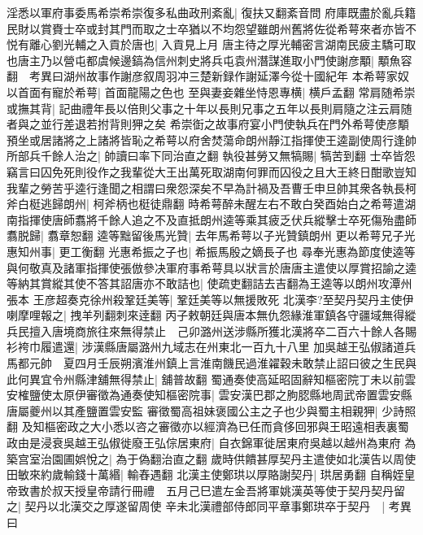 淫悉以軍府事委馬希崇希崇復多私曲政刑紊亂|{
	復扶又翻紊音問}
府庫既盡於亂兵籍民財以賞賚士卒或封其門而取之士卒猶以不均怨望雖朗州舊將佐從希萼來者亦皆不悦有離心劉光輔之入貢於唐也|{
	入貢見上月}
唐主待之厚光輔密言湖南民疲主驕可取也唐主乃以營屯都虞候邊鎬為信州刺史將兵屯袁州潛謀進取小門使謝彦顒|{
	顒魚容翻　考異曰湖州故事作謝彦叙周羽冲三楚新録作謝延澤今從十國紀年}
本希萼家奴以首面有寵於希萼|{
	首面龍陽之色也}
至與妻妾雜坐恃恩專横|{
	横戶孟翻}
常肩随希崇或撫其背|{
	記曲禮年長以倍則父事之十年以長則兄事之五年以長則肩隨之注云肩随者與之並行差退若拊背則狎之矣}
希崇衘之故事府宴小門使執兵在門外希萼使彦顒預坐或居諸將之上諸將皆恥之希萼以府舍焚蕩命朗州靜江指揮使王逵副使周行逢帥所部兵千餘人治之|{
	帥讀曰率下同治直之翻}
執役甚勞又無犒賜|{
	犒苦到翻}
士卒皆怨竊言曰囚免死則役作之我輩從大王出萬死取湖南何罪而囚役之且大王終日酣歌豈知我輩之勞苦乎逵行逢聞之相謂曰衆怨深矣不早為計禍及吾曹壬申旦帥其衆各執長柯斧白梃逃歸朗州|{
	柯斧柄也梃徒鼎翻}
時希萼醉未醒左右不敢白癸酉始白之希萼遣湖南指揮使唐師翥將千餘人追之不及直抵朗州逵等乘其疲乏伏兵縱擊士卒死傷殆盡師翥脱歸|{
	翥章恕翻}
逵等黜留後馬光贊|{
	去年馬希萼以子光贊鎮朗州}
更以希萼兄子光惠知州事|{
	更工衡翻}
光惠希振之子也|{
	希振馬殷之嫡長子也}
尋奉光惠為節度使逵等與何敬真及諸軍指揮使張倣參决軍府事希萼具以狀言於唐唐主遣使以厚賞招諭之逵等納其賞縱其使不答其詔唐亦不敢詰也|{
	使疏吏翻詰去吉翻為王逵等以朗州攻潭州張本}
王彦超奏克徐州殺鞏廷美等|{
	鞏廷美等以無援敗死}
北漢李?至契丹契丹主使伊喇摩哩報之|{
	拽羊列翻刺來逹翻}
丙子敕朝廷與唐本無仇怨緣淮軍鎮各守疆域無得縱兵民擅入唐境商旅往來無得禁止　己卯潞州送涉縣所獲北漢將卒二百六十餘人各賜衫袴巾履遣還|{
	涉漢縣唐屬潞州九域志在州東北一百九十八里}
加吳越王弘俶諸道兵馬都元帥　夏四月壬辰朔濱淮州鎮上言淮南饑民過淮糴穀未敢禁止詔曰彼之生民與此何異宜令州縣津舖無得禁止|{
	舖普故翻}
蜀通奏使高延昭固辭知樞密院丁未以前雲安榷鹽使太原伊審徵為通奏使知樞密院事|{
	雲安漢巴郡之朐䏰縣地周武帝置雲安縣唐屬夔州以其產鹽置雲安監}
審徵蜀高祖妹褒國公主之子也少與蜀主相親狎|{
	少詩照翻}
及知樞密政之大小悉以咨之審徵亦以經濟為已任而貪侈回邪與王昭遠相表裏蜀政由是浸衰吳越王弘俶徙廢王弘倧居東府|{
	自衣錦軍徙居東府吳越以越州為東府}
為築宫室治園圃娯悅之|{
	為于偽翻治直之翻}
歲時供饋甚厚契丹主遣使如北漢告以周使田敏來約歲輸錢十萬緡|{
	輸舂遇翻}
北漢主使鄭珙以厚賂謝契丹|{
	珙居勇翻}
自稱姪皇帝致書於叔天授皇帝請行冊禮　五月己巳遣左金吾將軍姚漢英等使于契丹契丹留之|{
	契丹以北漢交之厚遂留周使}
辛未北漢禮部侍郎同平章事鄭珙卒于契丹　|{
	考異曰}


